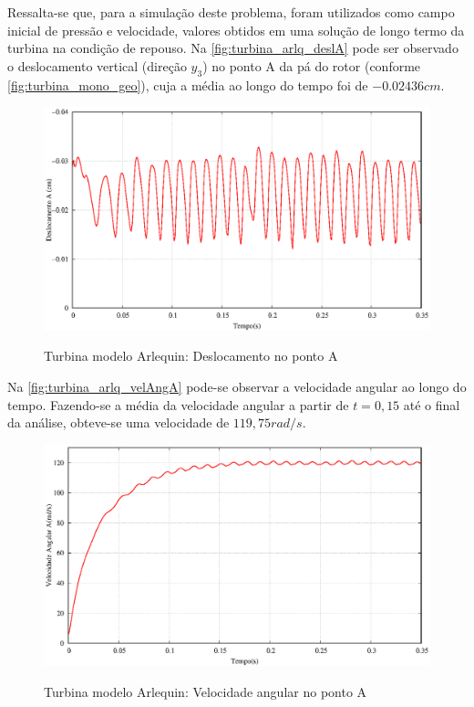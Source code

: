 Ressalta-se que, para a simulação deste problema, foram utilizados como campo inicial de pressão e velocidade, valores obtidos em uma solução de longo termo da turbina na condição de repouso. Na \autoref{fig:turbina_arlq_deslA} pode ser observado o deslocamento vertical (direção $y_3$) no ponto A da pá do rotor (conforme \autoref{fig:turbina_mono_geo}), cuja a média ao longo do tempo foi de $-0.02436cm$.

\begin{figure}[!htbp]
	\caption{Turbina modelo Arlequin: Deslocamento no ponto A}
	\centering 
	\includegraphics[scale=0.6,trim=0cm 0cm 0cm 0cm, clip=true]{Imagens/Cap7/turbina_arlq_deslocamento.eps}	
	\label{fig:turbina_arlq_deslA}
\end{figure}

Na \autoref{fig:turbina_arlq_velAngA} pode-se observar a velocidade angular ao longo do tempo. Fazendo-se a média da velocidade angular a partir de $t=0,15$ até o final da análise, obteve-se uma velocidade de  $119,75rad/s$.

\begin{figure}[!htbp]
	\caption{Turbina modelo Arlequin: Velocidade angular no ponto A}
	\centering 
	\includegraphics[scale=0.6,trim=0cm 0cm 0cm 0cm, clip=true]{Imagens/Cap7/turbina_arlq_velocidade_angular.eps}	
	\label{fig:turbina_arlq_velAngA}
\end{figure}

